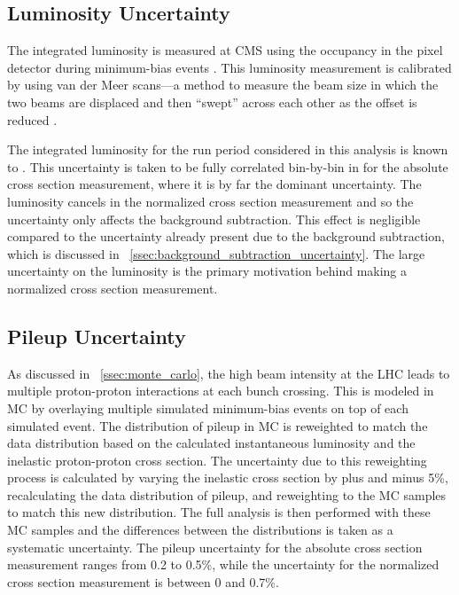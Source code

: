 \subsection{Luminosity Uncertainty}
\label{ssec:lumi_uncertainty}

The integrated luminosity is measured at CMS using the occupancy in the
pixel detector during minimum-bias events \cite{cms_lumi_2013}. This luminosity
measurement is calibrated by using van der Meer scans---a method to measure the
beam size in which the two beams are displaced and then ``swept'' across each
other as the offset is reduced \cite{vandermeer_1968}.

The integrated luminosity for the run period considered in this analysis is
known to \LumiUncertainty. This uncertainty is taken to be fully correlated
bin-by-bin in \phistar for the absolute cross section measurement, where it is
by far the dominant uncertainty. The luminosity cancels in the normalized
cross section measurement and so the uncertainty only affects the background
subtraction. This effect is negligible compared to the uncertainty already
present due to the background subtraction, which is discussed in
\SEC~\ref{ssec:background_subtraction_uncertainty}. The large uncertainty on
the luminosity is the primary motivation behind making a normalized cross
section measurement.

\subsection{Pileup Uncertainty}
\label{ssec:pileup_uncertainty}

As discussed in \SEC~\ref{ssec:monte_carlo}, the high beam intensity at the LHC
leads to multiple proton-proton interactions at each bunch crossing. This is
modeled in MC by overlaying multiple simulated minimum-bias events on top of
each simulated event. The distribution of pileup in MC is reweighted to match
the data distribution based on the calculated instantaneous luminosity and the
inelastic proton-proton cross section. The uncertainty due to this reweighting
process is calculated by varying the inelastic cross section by plus and minus
5\%, recalculating the data distribution of pileup, and reweighting to the MC
samples to match this new distribution. The full analysis is then performed
with these MC samples and the differences between the \phistar distributions is
taken as a systematic uncertainty. The pileup uncertainty for the absolute
cross section measurement ranges from 0.2 to 0.5\%, while the uncertainty for
the normalized cross section measurement is between 0 and 0.7\%.

